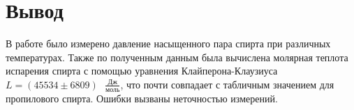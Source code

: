 \documentclass[a4paper,12pt]{article} %
\begin{document}
	\section*{Вывод}
	В работе было измерено давление насыщенного пара спирта при различных температурах. Также по полученным данным была вычислена молярная теплота испарения спирта с помощью уравнения Клайперона-Клаузиуса $L = (45534 \pm 6809) \text{ }\frac{\text{Дж}}{\text{моль}}$, что почти совпадает с табличным значением для пропилового спирта. Ошибки вызваны неточностью измерений.
\end{document}
